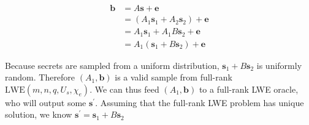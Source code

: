 \documentclass{article}
\begin{document}
$$
\begin{aligned}
\mathbf{b} &= A\mathbf{s} + \mathbf{e} \\
&= (A_1\mathbf{s}_1 + A_2\mathbf{s}_2) + \mathbf{e} \\
&= A_1\mathbf{s}_1 + A_1B\mathbf{s}_2 + \mathbf{e} \\
&= A_1(\mathbf{s}_1 + B\mathbf{s}_2) + \mathbf{e}
\end{aligned}
$$

Because secrets are sampled from a uniform distribution, $\mathbf{s}_1 + B\mathbf{s}_2$ is uniformly random. Therefore $(A_1, \mathbf{b})$ is a valid sample from full-rank $\text{LWE}(m, n, q, U_s, \chi_e)$. We can thus feed $(A_1, \mathbf{b})$ to a full-rank LWE oracle, who will output some $\mathbf{s}^\prime$. Assuming that the full-rank LWE problem has unique solution, we know $\mathbf{s}^\prime = \mathbf{s}_1 + B\mathbf{s}_2$

\end{document}
